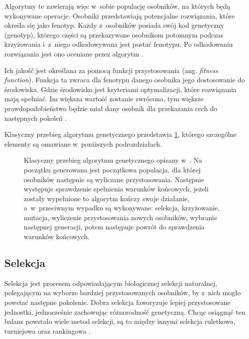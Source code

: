 Algorytmy te zawierają więc
w~sobie populację osobników,
na których będą wykonywane operacje.
Osobniki przedstawiają potencjalne
rozwiązania, które określa się jako fenotyp.
Każdy z~osobników posiada swój kod genetyczny
(genotyp), którego części są przekazywane
osobnikom potomnym podczas krzyżowania
i~z~niego odkodowywana jest postać fenotypu.
Po odkodowaniu rozwiązania jest ono
oceniane przez algorytm%
.

Ich jakość jest określana
za pomocą funkcji przystosowania
(ang. \textit{fitness function}).
Funkcja ta zwraca dla fenotypu danego osobnika
jego dostosowanie do środowiska.
Gdzie środowisko jest kryteriami optymalizacji,
które rozwiązania mają spełniać.
Im większa wartość zostanie zwrócona,
tym większe prawdopodobieństwo
będzie miał dany osobnik
dla przekazania cech
do następnych pokoleń%
.

Klasyczny przebieg algorytmu genetycznego
przedstawia \cref{fig:genetic_flow},
którego szczególne elementy są omawiane
w~poniższych podrozdziałach.
\begin{figure}
  \centering
  \resizebox{.95\textwidth}{!}{%
  }
  \caption{
    Klasyczny przebieg algorytmu genetycznego
    opisany w~.
    Na początku generowana jest początkowa populacja,
    dla której osobników następnie
    są wyliczane przystosowania.
    Następnie występuje sprawdzenie
    spełnienia warunków końcowych,
    jeżeli zostały wypełnione
    to algorytm kończy swoje działanie,
    a~w~przeciwnym wypadku są wykonywane:
    selekcja, krzyżowanie, mutacja,
    wyliczenie przystosowania nowych osobników,
    wybranie następnej generacji,
    potem następuje powrót
    do sprawdzenia warunków końcowych.
  }
  \label{fig:genetic_flow}
\end{figure}

\tocless\subsection{Selekcja}
Selekcja jest procesem odpowiadającym
biologicznej selekcji naturalnej,
polegającym na wyborze bardziej
przystosowanych osobników,
by z~nich mogło powstać
następne pokolenie.
Dobra selekcja faworyzuje
lepiej przystosowane jednostki,
jednocześnie zachowując
różnorodność genetyczną.
Chcąc osiągnąć ten balans
powstało wiele metod selekcji,
są to między innymi selekcja ruletkowa,
turniejowa oraz rankingowa%
.

